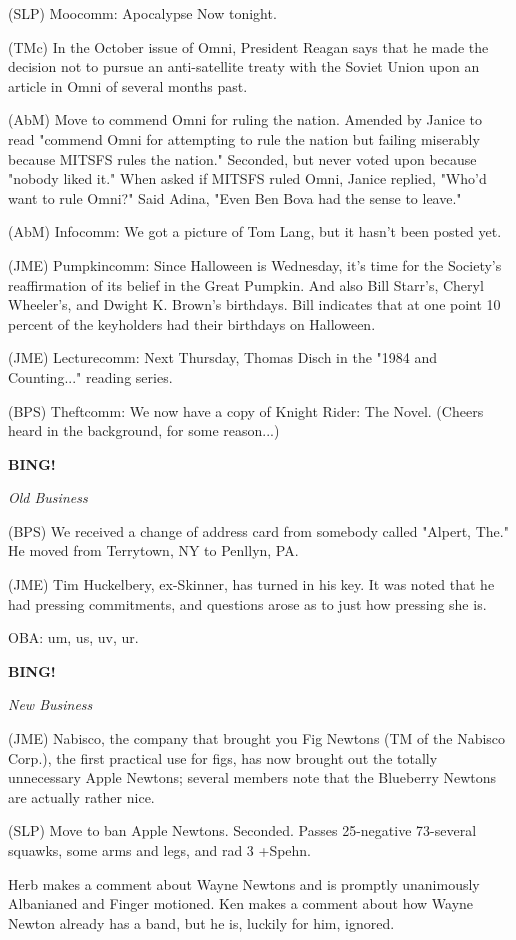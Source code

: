 \documentclass[12pt]{article}
\newcommand{\bing}{{\bf BING!} }
\newcommand{\goto}[1]{\bing \vskip 12pt \centerline{{\em{#1}}}}
\begin{document}
(SLP) Moocomm: Apocalypse Now tonight.

(TMc) In the October issue of Omni, President Reagan says that he made the decision not to pursue an anti-satellite treaty with the Soviet Union upon an article in Omni of several months past.

(AbM) Move to commend Omni for ruling the nation. Amended by Janice to read "commend Omni for attempting to rule the nation but failing miserably because MITSFS rules the nation." Seconded, but never voted upon because "nobody liked it." When asked if MITSFS ruled Omni, Janice replied, "Who'd want to rule Omni?" Said Adina, "Even Ben Bova had the sense to leave."

(AbM) Infocomm: We got a picture of Tom Lang, but it hasn't been posted yet.

(JME) Pumpkincomm: Since Halloween is Wednesday, it's time for the Society's reaffirmation of its belief in the Great Pumpkin. And also Bill Starr's, Cheryl Wheeler's, and Dwight K. Brown's birthdays. Bill indicates that at one point 10 percent of the keyholders had their birthdays on Halloween.

(JME) Lecturecomm: Next Thursday, Thomas Disch in the "1984 and Counting..." reading series.

(BPS) Theftcomm: We now have a copy of Knight Rider: The Novel. (Cheers heard in the background, for some reason...)

\goto{Old Business}

(BPS) We received a change of address card from somebody called "Alpert, The." He moved from Terrytown, NY to Penllyn, PA.

(JME) Tim Huckelbery, ex-Skinner, has turned in his key. It was noted that he had pressing commitments, and questions arose as to just how pressing she is.

OBA: um, us, uv, ur.

\goto{New Business}

(JME) Nabisco, the company that brought you Fig Newtons (TM of the Nabisco Corp.), the first practical use for figs, has now brought out the totally unnecessary Apple Newtons; several members note that the Blueberry Newtons are actually rather nice.

(SLP) Move to ban Apple Newtons. Seconded. Passes 25-negative 73-several squawks, some arms and legs, and rad 3 +Spehn.

Herb makes a comment about Wayne Newtons and is promptly unanimously Albanianed and Finger motioned. Ken makes a comment about how Wayne Newton already has a band, but he is, luckily for him, ignored.
\end{document}
